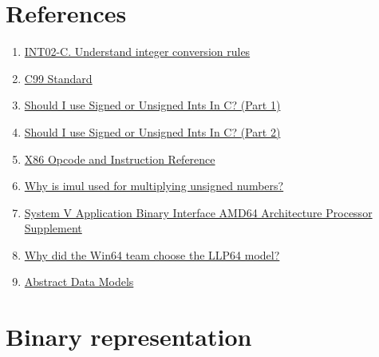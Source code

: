 \documentclass{article}
\begin{document}
\section{References}
\begin{enumerate}[noitemsep]
\item \href{https://wiki.sei.cmu.edu/confluence/display/c/INT02-C.+Understand+integer+conversion+rules}{INT02-C. Understand integer conversion rules}
\item \href{http://www.open-std.org/jtc1/sc22/wg14/www/docs/n1256.pdf}{C99 Standard}
\item \href{http://blog.robertelder.org/signed-or-unsigned/}{Should I use Signed or Unsigned Ints In C? (Part 1)}
\item \href{http://blog.robertelder.org/signed-or-unsigned-part-2/}{Should I use Signed or Unsigned Ints In C? (Part 2)}
\item \href{http://ref.x86asm.net/coder-abc.html}{X86 Opcode and Instruction Reference}
\item \href{https://stackoverflow.com/a/42589535/2407966}{Why is imul used for multiplying unsigned numbers?}
\item \href{http://www.unix.org/version2/whatsnew/lp64_wp.html}{System V Application Binary Interface AMD64 Architecture Processor Supplement}
\item \href{https://software.intel.com/sites/default/files/article/402129/mpx-linux64-abi.pdf}{Why did the Win64 team choose the LLP64 model?}
\item \href{https://blogs.msdn.microsoft.com/oldnewthing/20050131-00/?p=36563}{Abstract Data Models}
\end{enumerate}
\pagebreak
\section{Binary representation}
\end{document}
